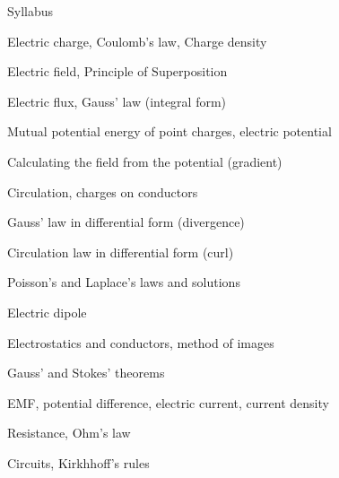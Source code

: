 %
%

\begin{frame}{Syllabus}

\begin{itemize}
{\small
\item
Electric charge, Coulomb’s law, Charge density
\item
Electric field, Principle of Superposition
\item
Electric flux, Gauss’ law (integral form)
\item
Mutual potential energy of point charges, electric potential
\item
Calculating the field from the potential (gradient)
\item
Circulation, charges on conductors
\item
Gauss’ law in differential form (divergence)
\item
Circulation law in differential form (curl)
\item
Poisson’s and Laplace’s laws and solutions
\item
Electric dipole
\item
Electrostatics and conductors, method of images
\item
Gauss’ and Stokes’ theorems
\item
EMF, potential difference, electric current, current density
\item
Resistance, Ohm’s law
\item
Circuits, Kirkhhoff’s rules
}
\end{itemize}

\end{frame}


